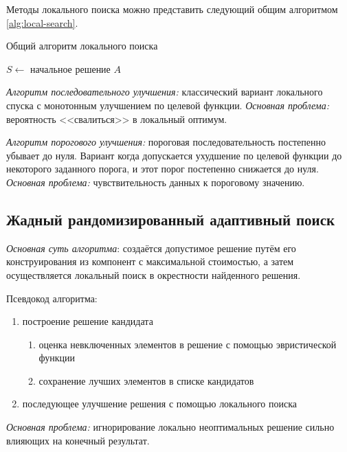 Методы локального поиска можно представить следующий общим алгоритмом \ref{alg:local-search}.
\begin{algorithm}[ht!]
    \caption{Общий алгоритм локального поиска}
    \( S \leftarrow \) начальное решение \( A \)\;
    \label{alg:local-search}
\end{algorithm}

\emph{Алгоритм последовательного улучшения:} классический вариант локального спуска с монотонным 
улучшением по целевой функции. \emph{Основная проблема:} вероятность <<свалиться>> в локальный оптимум.

\emph{Алгоритм порогового улучшения:} пороговая последовательность постепенно убывает до нуля. Вариант 
когда допускается ухудшение по целевой функции до некоторого заданного порога, и этот порог постепенно 
снижается до нуля. \emph{Основная проблема:} чувствительность данных к пороговому значению.

\subsection{Жадный рандомизированный адаптивный поиск}
\emph{Основная суть алгоритма}: создаётся допустимое решение путём его конструирования из компонент с 
максимальной стоимостью, а затем осуществляется локальный поиск в окрестности найденного решения.

Псевдокод алгоритма:
\begin{enumerate}
    \item построение решение кандидата
    \begin{enumerate}
        \item оценка невключенных элементов в решение с помощью эвристической функции
        \item сохранение лучших элементов в списке кандидатов
    \end{enumerate}
    \item последующее улучшение решения с помощью локального поиска
\end{enumerate}

\emph{Основная проблема:} игнорирование локально неоптимальных решение сильно влияющих на конечный результат.

